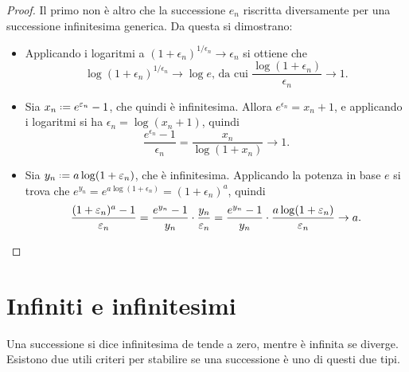 \begin{proof}
Il primo non è altro che la successione $e_n$ riscritta diversamente per una successione infinitesima generica. Da questa si dimostrano:
\begin{itemize}
\item Applicando i logaritmi a $(1+\epsilon_n)^{1/\epsilon_n}\to\epsilon_n$ si ottiene che
\[
\log(1+\epsilon_n)^{1/\epsilon_n}\to\log e\text{,  da cui  }\frac{\log(1+\epsilon_n)}{\epsilon_n}\to 1.
\]
\item Sia $x_n\defeq e^{\epsilon_n}-1$, che quindi è infinitesima. Allora $e^{\epsilon_n}=x_n+1$, e applicando i logaritmi si ha $\epsilon_n=\log(x_n+1)$, quindi
\[
\frac{e^{\epsilon_n}-1}{\epsilon_n}=\frac{x_n}{\log(1+x_n)}\to 1.
\]
\item Sia $y_n\defeq a\log(1+\epsilon_n)$, che è infinitesima. Applicando la potenza in base $e$ si trova che $e^{y_n}=e^{a\log(1+\epsilon_n)}=(1+\epsilon_n)^a$, quindi
\[
\frac{(1+\epsilon_n)^a-1}{\epsilon_n}=\frac{e^{y_n}-1}{y_n}\cdot\frac{y_n}{\epsilon_n}=\frac{e^{y_n}-1}{y_n}\cdot\frac{a\log(1+\epsilon_n)}{\epsilon_n}\to a.\qedhere
\]
\end{itemize}
\end{proof}

\section{Infiniti e infinitesimi}
Una successione si dice infinitesima de tende a zero, mentre è infinita se diverge. Esistono due utili criteri per stabilire se una successione è uno di questi due tipi.

